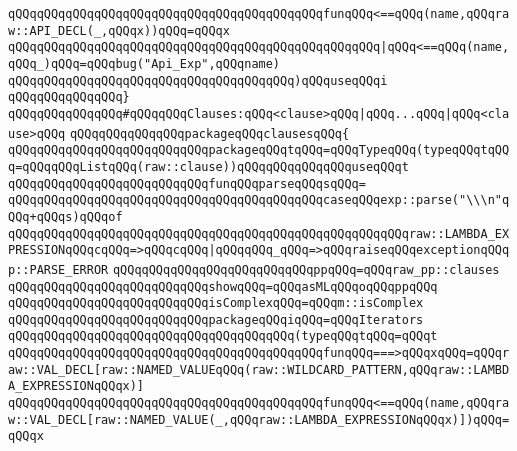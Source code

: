 \verb|qQQqqQQqqQQqqQQqqQQqqQQqqQQqqQQqqQQqqQQqqQQqfunqQQq<==qQQq(name,qQQqraw::API_DECL(_,qQQqx))qQQq=qQQqx|\newline
\verb|qQQqqQQqqQQqqQQqqQQqqQQqqQQqqQQqqQQqqQQqqQQqqQQqqQQq|\verb#|qQQq<==qQQq(name,qQQq_)qQQq=qQQqbug("Api_Exp",qQQqname)#\newline
\verb|qQQqqQQqqQQqqQQqqQQqqQQqqQQqqQQqqQQqqQQq)qQQquseqQQqi|\newline
\verb|qQQqqQQqqQQqqQQq}|\newline
\newline
\verb|qQQqqQQqqQQqqQQq#qQQqqQQqClauses:qQQq<clause>qQQq|\verb#|qQQq...qQQq|qQQq<clause>qQQq#\newline
\verb|qQQqqQQqqQQqqQQqpackageqQQqclausesqQQq{|\newline
\newline
\verb|qQQqqQQqqQQqqQQqqQQqqQQqqQQqpackageqQQqtqQQq=qQQqTypeqQQq(typeqQQqtqQQq=qQQqqQQqListqQQq(raw::clause))qQQqqQQqqQQqqQQquseqQQqt|\newline
\verb|qQQqqQQqqQQqqQQqqQQqqQQqqQQqfunqQQqparseqQQqsqQQq=|\newline
\verb|qQQqqQQqqQQqqQQqqQQqqQQqqQQqqQQqqQQqqQQqqQQqcaseqQQqexp::parse("\\\n"qQQq+qQQqs)qQQqof|\newline
\verb|qQQqqQQqqQQqqQQqqQQqqQQqqQQqqQQqqQQqqQQqqQQqqQQqqQQqqQQqraw::LAMBDA_EXPRESSIONqQQqcqQQq=>qQQqcqQQq|\verb#|qQQqqQQq_qQQq=>qQQqraiseqQQqexceptionqQQqp::PARSE_ERROR#\newline
\newline
\verb|qQQqqQQqqQQqqQQqqQQqqQQqqQQqppqQQq=qQQqraw_pp::clauses|\newline
\verb|qQQqqQQqqQQqqQQqqQQqqQQqqQQqshowqQQq=qQQqasMLqQQqoqQQqppqQQq|\newline
\verb|qQQqqQQqqQQqqQQqqQQqqQQqqQQqisComplexqQQq=qQQqm::isComplex|\newline
\newline
\verb|qQQqqQQqqQQqqQQqqQQqqQQqqQQqpackageqQQqiqQQq=qQQqIterators|\newline
\verb|qQQqqQQqqQQqqQQqqQQqqQQqqQQqqQQqqQQqqQQq(typeqQQqtqQQq=qQQqt|\newline
\verb|qQQqqQQqqQQqqQQqqQQqqQQqqQQqqQQqqQQqqQQqqQQqfunqQQq===>qQQqxqQQq=qQQqraw::VAL_DECL[raw::NAMED_VALUEqQQq(raw::WILDCARD_PATTERN,qQQqraw::LAMBDA_EXPRESSIONqQQqx)]|\newline
\verb|qQQqqQQqqQQqqQQqqQQqqQQqqQQqqQQqqQQqqQQqqQQqfunqQQq<==qQQq(name,qQQqraw::VAL_DECL[raw::NAMED_VALUE(_,qQQqraw::LAMBDA_EXPRESSIONqQQqx)])qQQq=qQQqx|\newline

